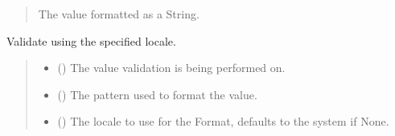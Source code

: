 \documentclass[letterpaper,10pt,english]{sphinxmanual}
\begin{document}
\begin{fulllineitems}
\begin{fulllineitems}
\begin{quote}
\begin{description}
\begin{itemize}
\end{itemize}

\sphinxAtStartPar
The value formatted as a String.

\end{description}\end{quote}

\end{fulllineitems}


\begin{fulllineitems}
\label{\detokenize{apache_commons_validator_python.routines:apache_commons_validator_python.routines.abstract_calendar_validator.AbstractCalendarValidator.is_valid}}
\pysigstartsignatures
{}
\pysigstopsignatures
\sphinxAtStartPar
Validate using the specified locale.
\begin{quote}\begin{description}
\begin{itemize}
\item {} 
\sphinxAtStartPar
{} () \textendash{} The value validation is being performed on.

\item {} 
\sphinxAtStartPar
{} () \textendash{} The pattern used to format the value.

\item {} 
\sphinxAtStartPar
{} () \textendash{} The locale to use for the Format, defaults to the system if None.


\end{itemize}
\end{description}
\end{quote}
\end{fulllineitems}
\end{fulllineitems}
\end{document}

